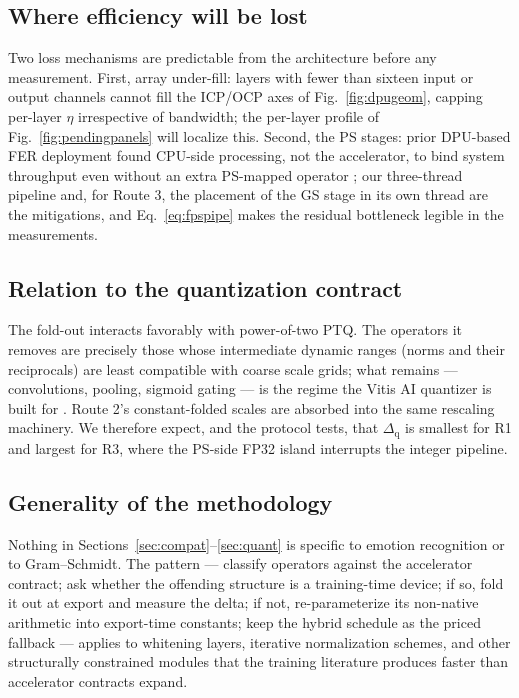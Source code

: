 \documentclass[onecolumn,journal]{IEEEtran}
\begin{document}
\subsection{Where efficiency will be lost}
Two loss mechanisms are predictable from the architecture before any measurement.
First, array under-fill: layers with fewer than sixteen input or output channels
cannot fill the ICP/OCP axes of Fig.~\ref{fig:dpugeom}, capping per-layer $\eta$
irrespective of bandwidth; the per-layer profile of Fig.~\ref{fig:pendingpanels} will
localize this. Second, the PS stages: prior DPU-based FER deployment found CPU-side
processing, not the accelerator, to bind system throughput even without an extra
PS-mapped operator \cite{ando2025fer}; our three-thread pipeline and, for Route 3, the
placement of the GS stage in its own thread are the mitigations, and
Eq.~\eqref{eq:fpspipe} makes the residual bottleneck legible in the measurements.

\subsection{Relation to the quantization contract}
The fold-out interacts favorably with power-of-two PTQ. The operators it removes are
precisely those whose intermediate dynamic ranges (norms and their reciprocals) are
least compatible with coarse scale grids; what remains --- convolutions, pooling,
sigmoid gating --- is the regime the Vitis AI quantizer is built for
\cite{amd_ug1414,krishnamoorthi2018quantizing}. Route 2's constant-folded scales are
absorbed into the same rescaling machinery. We therefore expect, and the protocol
tests, that $\Delta_{\mathrm{q}}$ is smallest for R1 and largest for R3, where the
PS-side FP32 island interrupts the integer pipeline.

\subsection{Generality of the methodology}
Nothing in Sections~\ref{sec:compat}--\ref{sec:quant} is specific to emotion
recognition or to Gram--Schmidt. The pattern --- classify operators against the
accelerator contract; ask whether the offending structure is a training-time device;
if so, fold it out at export and measure the delta; if not, re-parameterize its
non-native arithmetic into export-time constants; keep the hybrid schedule as the
priced fallback --- applies to whitening layers, iterative normalization schemes, and
other structurally constrained modules that the training literature produces faster
than accelerator contracts expand.
\end{document}
